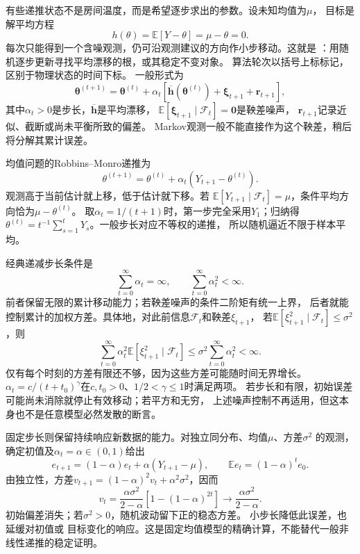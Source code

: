 有些递推状态不是房间温度，而是希望逐步求出的参数。设未知均值为$\mu$，
目标是解平均方程
\begin{equation}
  h(\theta)=\mathbb E[Y-\theta]=\mu-\theta=0.
  \label{eq:stoch-mean-root}
\end{equation}
每次只能得到一个含噪观测，仍可沿观测建议的方向作小步移动。这就是
：用随机逐步更新寻找平均漂移的根，或其稳定不变对象。
算法轮次以括号上标标记，区别于物理状态的时间下标。
一般形式为
\begin{equation}
  \bm\theta^{(t+1)}=\bm\theta^{(t)}+\alpha_t
   [\overline{\bm h}(\bm\theta^{(t)})+\bm\xi_{t+1}+\bm r_{t+1}],
  \label{eq:stoch-general-stochastic-approximation}
\end{equation}
其中$\alpha_t>0$是步长，$\overline{\bm h}$是平均漂移，
$\mathbb E[\bm\xi_{t+1}\mid\mathcal F_t]=\bm0$是鞅差噪声，
$\bm r_{t+1}$记录近似、截断或尚未平衡所致的偏差。
Markov观测一般不能直接作为这个鞅差，稍后将分解其累计误差。

均值问题的Robbins--Monro递推为
\begin{equation}
  \theta^{(t+1)}=\theta^{(t)}
       +\alpha_t(Y_{t+1}-\theta^{(t)}).
  \label{eq:stoch-robbins-monro-mean}
\end{equation}
观测高于当前估计就上移，低于估计就下移。若
$\mathbb E[Y_{t+1}\mid\mathcal F_t]=\mu$，条件平均方向恰为$\mu-\theta^{(t)}$。
取$\alpha_t=1/(t+1)$时，第一步完全采用$Y_1$；归纳得
$\theta^{(t)}=t^{-1}\sum_{s=1}^tY_s$。一般步长对应不等权的递推，
所以随机逼近不限于样本平均。

经典递减步长条件是
\begin{equation}
  \sum_{t=0}^\infty\alpha_t=\infty,\qquad
  \sum_{t=0}^\infty\alpha_t^2<\infty.
  \label{eq:stoch-robbins-monro-stepsizes}
\end{equation}
前者保留无限的累计移动能力；若鞅差噪声的条件二阶矩有统一上界，
后者就能控制累计的加权方差。具体地，对此前信息$\mathcal F_t$和鞅差$\xi_{t+1}$，
若$\mathbb E[\xi_{t+1}^2\mid\mathcal F_t]\leq\sigma^2$，则
\[
 \sum_{t=0}^\infty\alpha_t^2
 \mathbb E[\xi_{t+1}^2\mid\mathcal F_t]
 \leq\sigma^2\sum_{t=0}^\infty\alpha_t^2<\infty.
\]
仅有每个时刻的方差有限还不够，因为这些方差可能随时间无界增长。
$\alpha_t=c/(t+t_0)^\gamma$在$c,t_0>0$、$1/2<\gamma\leq1$时满足两项。
若步长和有限，初始误差可能尚未消除就停止有效移动；若平方和无穷，
上述噪声控制不再适用，但这本身也不是任意模型必然发散的断言。

固定步长则保留持续响应新数据的能力。对独立同分布、均值$\mu$、方差$\sigma^2$
的观测，确定初值及$\alpha_t=\alpha\in(0,1)$给出
\[
  e_{t+1}=(1-\alpha)e_t+\alpha(Y_{t+1}-\mu),\qquad
  \mathbb E e_t=(1-\alpha)^t e_0.
\]
由独立性，方差$v_{t+1}=(1-\alpha)^2v_t+\alpha^2\sigma^2$，因而
\[
  v_t=\frac{\alpha\sigma^2}{2-\alpha}
       [1-(1-\alpha)^{2t}]
  \longrightarrow\frac{\alpha\sigma^2}{2-\alpha}.
\]
初始偏差消失；若$\sigma^2>0$，随机波动留下正的稳态方差。
小步长降低此误差，也延缓对初值或
目标变化的响应。这是固定均值模型的精确计算，不能替代一般非线性递推的稳定证明。

